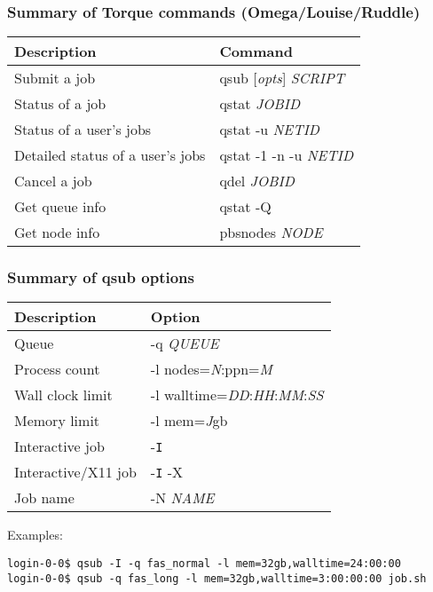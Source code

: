\documentclass[10pt]{beamer}
\begin{document}
\begin{frame}
\frametitle{Summary of Torque commands (Omega/Louise/Ruddle)}
\begin{tabular}{|l|l|}
\hline
\textbf{Description} & \textbf{Command} \\
\hline
Submit a job & qsub [\textit{opts}] \textit{SCRIPT} \\
\hline
Status of a job & qstat \textit{JOBID} \\
\hline
Status of a user's jobs & qstat -u \textit{NETID} \\
\hline
Detailed status of a user's jobs & qstat -1 -n -u \textit{NETID} \\
\hline
Cancel a job & qdel \textit{JOBID} \\
\hline
Get queue info & qstat -Q \\
\hline
Get node info & pbsnodes \textit{NODE} \\
\hline
\end{tabular}
\end{frame}

\begin{frame}[fragile]
\frametitle{Summary of qsub options}
\begin{tabular}{|l|l|}
\hline
\textbf{Description} & \textbf{Option} \\
\hline
Queue & -q \textit{QUEUE} \\
\hline
Process count & -l nodes=\textit{N}:ppn=\textit{M} \\
\hline
Wall clock limit & -l walltime=\textit{DD}:\textit{HH}:\textit{MM}:\textit{SS} \\
\hline
Memory limit & -l mem=\textit{J}gb \\
\hline
Interactive job & -\texttt{I} \\
\hline
Interactive/X11 job & -\texttt{I} -X \\
\hline
Job name & -N \textit{NAME} \\
\hline
\end{tabular}

\vskip10pt
Examples:
\begin{verbatim}
login-0-0$ qsub -I -q fas_normal -l mem=32gb,walltime=24:00:00
login-0-0$ qsub -q fas_long -l mem=32gb,walltime=3:00:00:00 job.sh
\end{verbatim}
\end{frame}
\end{document}

